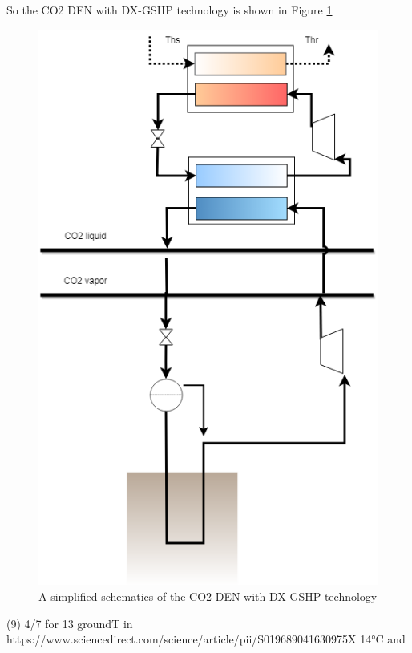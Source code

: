 \documentclass{article}
\begin{document}
 
So the CO2 DEN with DX-GSHP technology is shown in Figure \ref{fig:co2_gshp}

\begin{figure}[h!]
\centering
\includegraphics[width=1\textwidth]{CO2-DX-GSHP.png}
\caption{A simplified schematics of the CO2 DEN with DX-GSHP technology}
\label{fig:co2_gshp}
\end{figure}


(9) 4/7 for 13 groundT in https://www.sciencedirect.com/science/article/pii/S019689041630975X 
14\si{\celsius}\cite{ghazizade-ahsaeeEnergyExergyInvestigation2018} and \cite{austinParametricStudyPerformance2011}
\end{document}
